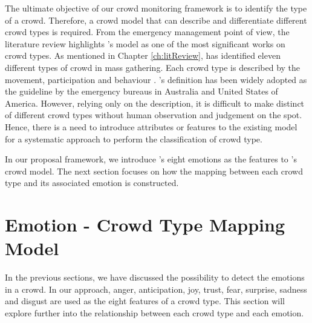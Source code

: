 The ultimate objective of our crowd monitoring framework is to identify the type of a crowd. Therefore, a crowd model that can describe and differentiate different crowd types is required. From the emergency management point of view, the literature review highlights \citet{Berlonghi1995}'s model as one of the most significant works on crowd types. As mentioned in Chapter \ref{ch:litReview}, \citet{Berlonghi1995} has identified eleven different types of crowd in mass gathering. Each crowd type is described by the movement, participation and behaviour \citep{Zeitz2009}. \citet{Berlonghi1995}'s definition has been widely adopted as the guideline by the emergency bureaus in Australia and United States of America. However, relying only on the description, it is difficult to make distinct of different crowd types without human observation and judgement on the spot. Hence, there is a need to introduce attributes or features to the existing model for a systematic approach to perform the classification of crowd type.

In our proposal framework, we introduce \citet{Plutchik1980}'s eight emotions as the features to \citet{Berlonghi1995}'s crowd model. The next section focuses on how the mapping between each crowd type and its associated emotion is constructed.

\section{Emotion - Crowd Type Mapping Model}
In the previous sections, we have discussed the possibility to detect the emotions in a crowd. In our approach, anger, anticipation, joy, trust, fear, surprise, sadness and disgust are used as the eight features of a crowd type. This section will explore further into the relationship between each crowd type and each emotion.

